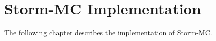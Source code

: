 \chapter{Storm-MC Implementation}

The following chapter describes the implementation of Storm-MC.

\section{}
